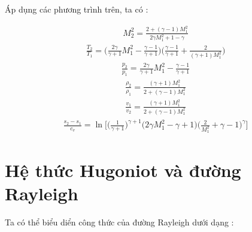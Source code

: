 \documentclass[DONG_CHAY_NEN_DUOC.tex]{subfiles}
\begin{document}
Áp dụng các phương trình trên, ta có :

\begin{equation}
	\begin{aligned}
		\boxed{
			M_2^2 = \frac{2 + (\gamma-1)M_1^2}{2\gamma M_1^2 + 1 - \gamma}
		}
	\end{aligned}
\end{equation}
\begin{equation}
	\begin{aligned}
		\boxed{
			\frac{T_2}{T_1} = \Biggl( \frac{2\gamma}{\gamma +1} M_1^2 - \frac{\gamma-1}{\gamma+1}   \Biggr)\Biggl( \frac{\gamma-1}{\gamma+1}  + \frac{2}{(\gamma+1)M_1^2}\Biggr)
		}
	\end{aligned}
\end{equation}
\begin{equation}
	\begin{aligned}
		\boxed{
			\frac{p_2}{p_1} = \frac{2\gamma}{\gamma + 1}M_1^2-\frac{\gamma-1}{\gamma+1}
		}
	\end{aligned}
\end{equation}
\begin{equation}
	\begin{aligned}
		\boxed{
			\frac{\rho_2}{\rho_1} = \frac{(\gamma+1)M_1^2}{2+(\gamma-1)M_1^2}
		}
	\end{aligned}
\end{equation}
\begin{equation}
	\begin{aligned}
		\boxed{
			\frac{v_1}{v_2} = \frac{(\gamma+1)M_1^2}{2+(\gamma-1)M_1^2}
		}
	\end{aligned}
\end{equation}
\begin{equation}
	\begin{aligned}
		\boxed{
			\frac{s_2-s_1}{c_v} = \ln\Biggl[ \Bigg(   \frac{1}{\gamma + 1}\Bigg)^{\gamma +1 } \Big(2\gamma M_1^2 - \gamma + 1\Big)\Bigg( \frac{2}{M_1^2 }+\gamma -1 \Bigg)^{\gamma}\Biggr]
		}
	\end{aligned}
\end{equation}
\section{Hệ thức Hugoniot và đường Rayleigh}

Ta có thể biểu diển công thức của đường Rayleigh dưới dạng : 
\end{document}
